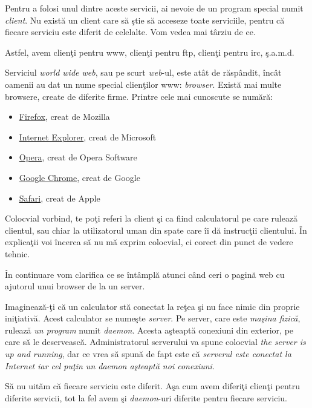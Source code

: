 Pentru a folosi unul dintre aceste servicii, ai nevoie de un program
special numit \textsl{client}. Nu există un client care să {\glqq}ştie{\grqq} 
să acceseze toate serviciile, pentru
că fiecare serviciu este diferit de celelalte. Vom vedea mai târziu de ce.

Astfel, avem clienţi pentru www, clienţi pentru ftp, clienţi pentru irc, ş.a.m.d.

Serviciul \textit{world wide web}, sau pe scurt \textit{web}-ul, este atât de răspândit, încât
oamenii au dat un nume special clienţilor www: \textsl{browser}. Există mai multe browsere,
create de diferite firme. Printre cele mai cunoscute se numără:
\begin{itemize}
\item \href{http://en.wikipedia.org/wiki/Firefox}{Firefox}, creat de Mozilla
\item \href{http://en.wikipedia.org/wiki/Internet_explorer}{Internet Explorer}, creat de Microsoft
\item \href{http://en.wikipedia.org/wiki/Opera_(web_browser)}{Opera}, creat de Opera Software
\item \href{http://en.wikipedia.org/wiki/Chrome_(web_browser)}{Google Chrome}, creat de Google
\item \href{http://en.wikipedia.org/wiki/Safari_(browser)}{Safari}, creat de Apple
\end{itemize}

Colocvial vorbind, te poţi referi la client şi
ca fiind calculatorul pe care rulează clientul, sau chiar la utilizatorul uman din spate
care îi dă instrucţii clientului. În explicaţii voi încerca să nu mă exprim colocvial, ci
corect din punct de vedere tehnic.

În continuare vom clarifica ce se întâmplă atunci când ceri o pagină web cu ajutorul
unui browser de la un server.

Imaginează-ţi că un calculator stă conectat la reţea şi
nu face nimic din {\glqq}proprie iniţiativă{\grqq}.
Acest calculator se numeşte \textsl{server}. Pe server, care este
\textit{maşina fizică}, rulează \textit{un program} numit \textsl{daemon}.
Acesta aşteaptă conexiuni din
exterior, pe care să le deservească. Administratorul serverului va spune colocvial
\textit{the server is up and running}, dar ce vrea să spună de fapt este că \textit{serverul
este conectat la Internet iar cel puţin un daemon aşteaptă noi conexiuni}.

Să nu uităm că fiecare serviciu este diferit. Aşa cum avem diferiţi clienţi pentru
diferite servicii, tot la fel avem şi \textit{daemon}-uri diferite pentru fiecare serviciu.

